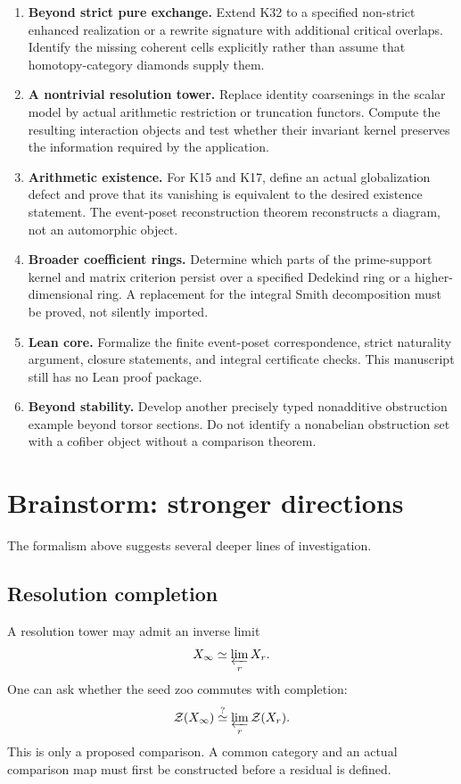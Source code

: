 \documentclass[11pt]{article}
\theoremstyle{definition}
\theoremstyle{remark}
\newcommand{\Zoo}{\mathcal Z}
\begin{document}
\begin{enumerate}
\item \textbf{Beyond strict pure exchange.} Extend K32 to a specified non-strict enhanced realization or a rewrite signature with additional critical overlaps. Identify the missing coherent cells explicitly rather than assume that homotopy-category diamonds supply them.
\item \textbf{A nontrivial resolution tower.} Replace identity coarsenings in the scalar model by actual arithmetic restriction or truncation functors. Compute the resulting interaction objects and test whether their invariant kernel preserves the information required by the application.
\item \textbf{Arithmetic existence.} For K15 and K17, define an actual globalization defect and prove that its vanishing is equivalent to the desired existence statement. The event-poset reconstruction theorem reconstructs a diagram, not an automorphic object.
\item \textbf{Broader coefficient rings.} Determine which parts of the prime-support kernel and matrix criterion persist over a specified Dedekind ring or a higher-dimensional ring. A replacement for the integral Smith decomposition must be proved, not silently imported.
\item \textbf{Lean core.} Formalize the finite event-poset correspondence, strict naturality argument, closure statements, and integral certificate checks. This manuscript still has no Lean proof package.
\item \textbf{Beyond stability.} Develop another precisely typed nonadditive obstruction example beyond torsor sections. Do not identify a nonabelian obstruction set with a cofiber object without a comparison theorem.
\end{enumerate}

\section{Brainstorm: stronger directions}

The formalism above suggests several deeper lines of investigation.

\subsection{Resolution completion}
A resolution tower may admit an inverse limit
\[
X_\infty\simeq\varprojlim_r X_r.
\]
One can ask whether the seed zoo commutes with completion:
\[
\Zoo(X_\infty)
\stackrel{?}{\simeq}
\varprojlim_r\Zoo(X_r).
\]
This is only a proposed comparison. A common category and an actual comparison map must first be constructed before a residual is defined.
\end{document}
